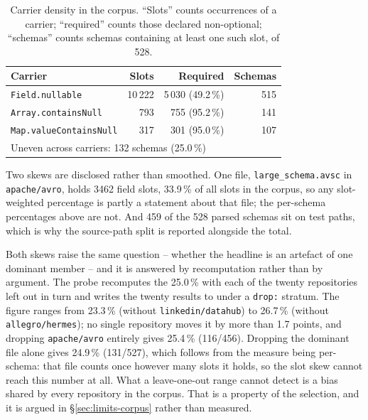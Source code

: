 \begin{table}[t]
  \caption{Carrier density in the corpus. ``Slots'' counts occurrences of a carrier; ``required'' counts those declared non-optional; ``schemas'' counts schemas containing at least one such slot, of 528.}
  \label{tab:carriers}
  \centering
  \scriptsize
  \begin{tabular}{lrrr}
    \toprule
    Carrier & Slots & Required & Schemas \\
    \midrule
    \texttt{Field.nullable} & 10\,222 & 5\,030 (49.2\,\%) & 515 \\
    \texttt{Array.containsNull} & 793 & 755 (95.2\,\%) & 141 \\
    \texttt{Map.valueContainsNull} & 317 & 301 (95.0\,\%) & 107 \\
    \midrule
    \multicolumn{4}{l}{Uneven across carriers: 132 schemas (25.0\,\%)} \\
    \bottomrule
  \end{tabular}
\end{table}

Two skews are disclosed rather than smoothed. One file, \texttt{large\_schema.avsc} in \texttt{apache/avro}, holds 3462 field slots, 33.9\,\% of all slots in the corpus, so any slot-weighted percentage is partly a statement about that file; the per-schema percentages above are not. And 459 of the 528 parsed schemas sit on test paths, which is why the source-path split is reported alongside the total.

Both skews raise the same question -- whether the headline is an artefact of one dominant member -- and it is answered by recomputation rather than by argument. The probe recomputes the 25.0\,\% with each of the twenty repositories left out in turn and writes the twenty results to  under a \texttt{drop:} stratum. The figure ranges from 23.3\,\% (without \texttt{linkedin/datahub}) to 26.7\,\% (without \texttt{allegro/hermes}); no single repository moves it by more than 1.7 points, and dropping \texttt{apache/avro} entirely gives 25.4\,\% (116/456). Dropping the dominant file alone gives 24.9\,\% (131/527), which follows from the measure being per-schema: that file counts once however many slots it holds, so the slot skew cannot reach this number at all. What a leave-one-out range cannot detect is a bias shared by every repository in the corpus. That is a property of the selection, and it is argued in \S\ref{sec:limits-corpus} rather than measured.

